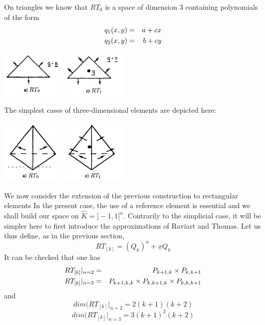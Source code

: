 \begin{displayquote}
{\color{darkgray}
On triangles we know that $RT_0$ is a space of dimension 3 containing polynomials of the form
\begin{eqnarray}
q_1(x,y)&=&a+cx \nonumber\\
q_2(x,y)&=&b+cy \nonumber
\end{eqnarray}

\begin{center}
\includegraphics[width=3cm]{images/pair_raviart-thomas/brfo1}
\includegraphics[width=3cm]{images/pair_raviart-thomas/brfo2}
\end{center}
The simplest cases of three-dimensional elements are depicted here:
\begin{center}
\includegraphics[width=3cm]{images/pair_raviart-thomas/brfo3}
\includegraphics[width=3cm]{images/pair_raviart-thomas/brfo4}
\end{center}

We now consider the extension of the previous construction to rectangular 
elements
In the present case, the use of a reference element is essential and we shall build
our space on $\hat{K}=]-1,1[^n$. Contrarily to the simplicial case, it will be
simpler here to first introduce the approximations of Raviart and Thomas.
Let us thus define, as in the previous section,
\[
RT_{[k]} = (Q_k)^n + \underline{x} Q_k
\]
It can be checked that one has
\begin{eqnarray}
RT_{[k]}|_{n=2} &=& P_{k+1,k} \times P_{k,k+1} \nonumber\\
RT_{[k]}|_{n=3} &=& P_{k+1,k,k} \times P_{k,k+1,k} \times P_{k,k,k+1} \nonumber
\end{eqnarray}
and 
\[
dim(RT_{[k]}|_{n=2} = 2(k+1)(k+2)
\]
\[
dim(RT_{[k]}|_{n=3} = 3(k+1)^2(k+2)
\]

}
\end{displayquote}



